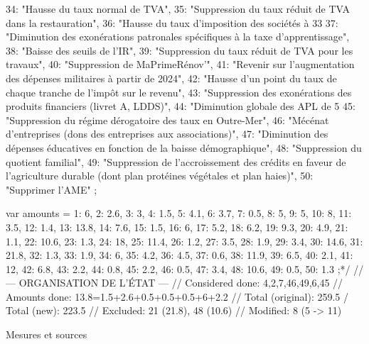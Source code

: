 {        34: "Hausse du taux normal de TVA",
        35: "Suppression du taux réduit de TVA dans la restauration",
        36: "Hausse du taux d'imposition des sociétés à 33 %
        37: "Diminution des exonérations patronales spécifiques à la taxe d'apprentissage",
        38: "Baisse des seuils de l'IR",
        39: "Suppression du taux réduit de TVA pour les travaux",
        40: "Suppression de MaPrimeRénov'",
        41: "Revenir sur l'augmentation des dépenses militaires à partir de 2024",
        42: "Hausse d'un point du taux de chaque tranche de l'impôt sur le revenu",
        43: "Suppression des exonérations des produits financiers (livret A, LDDS)",
        44: "Diminution globale des APL de 5 %
        45: "Suppression du régime dérogatoire des taux en Outre-Mer",
        46: "Mécénat d'entreprises (dons des entreprises aux associations)",
        47: "Diminution des dépenses éducatives en fonction de la baisse démographique",
        48: "Suppression du quotient familial",
        49: "Suppression de l'accroissement des crédits en faveur de l'agriculture durable (dont plan protéines végétales et plan haies)",
        50: "Supprimer l'AME"
    };

    var amounts = {
        1:  6,      2:  2.6,   3:  3,     4:  1.5,   5:  4.1,
        6:  3.7,    7:  0.5,   8:  5,     9:  5,     10: 8,
        11: 3.5,    12: 1.4,   13: 13.8,  14: 7.6,   15: 1.5,
        16: 6,      17: 5.2,   18: 6.2,   19: 9.3,   20: 4.9,
        21: 1.1,    22: 10.6,  23: 1.3,   24: 18,    25: 11.4,
        26: 1.2,    27: 3.5,   28: 1.9,   29: 3.4,   30: 14.6,
        31: 21.8,   32: 1.3,   33: 1.9,   34: 6,     35: 4.2,
        36: 4.5,    37: 0.6,   38: 11.9,  39: 6.5,   40: 2.1,
        41: 12,     42: 6.8,   43: 2.2,   44: 0.8,   45: 2.2,
        46: 0.5,    47: 3.4,   48: 10.6,  49: 0.5,   50: 1.3
    };*/
   // --- ORGANISATION DE L'ÉTAT ---
	// Considered done: 4,2,7,46,49,6,45
	// Amounts done: 13.8=1.5+2.6+0.5+0.5+0.5+6+2.2 
	// Total (original): 259.5 / Total (new): 223.5
	// Excluded: 21 (21.8), 48 (10.6)
	// Modified: 8 (5 -> 11)
	
Mesures et sources

